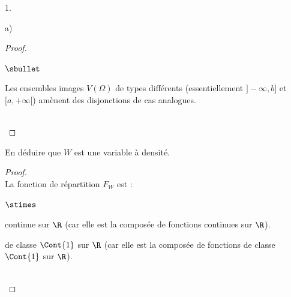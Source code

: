 \documentclass[11pt]{article}%
\begin{document}
\begin{noliste}{1.}
\begin{noliste}{a)}
\begin{proof}
\begin{remarkL}{.96}
\begin{noliste}{$\sbullet$}
        \item Les ensembles images $V(\Omega)$ de types différents
          (essentiellement $]-\infty, b]$ et $[a, +\infty[$) amènent
          des disjonctions de cas analogues.
        \end{noliste}
      \end{remarkL}~\\[-1.2cm]
    \end{proof}
    

    \newpage


  \item En déduire que $W$ est une variable à densité.
  
  \begin{proof}~\\
      La fonction de répartition $F_W$ est :
      \begin{noliste}{$\stimes$}
      \item continue sur $\R$ (car elle est la composée de fonctions
        continues sur $\R$).
      \item de classe $\Cont{1}$ sur $\R$ (car elle est la composée de
        fonctions de classe $\Cont{1}$ sur $\R$).
      \end{noliste}
      ~\\[-1.2cm]
    \end{proof}
  \end{noliste}
\end{noliste}
\end{document}
